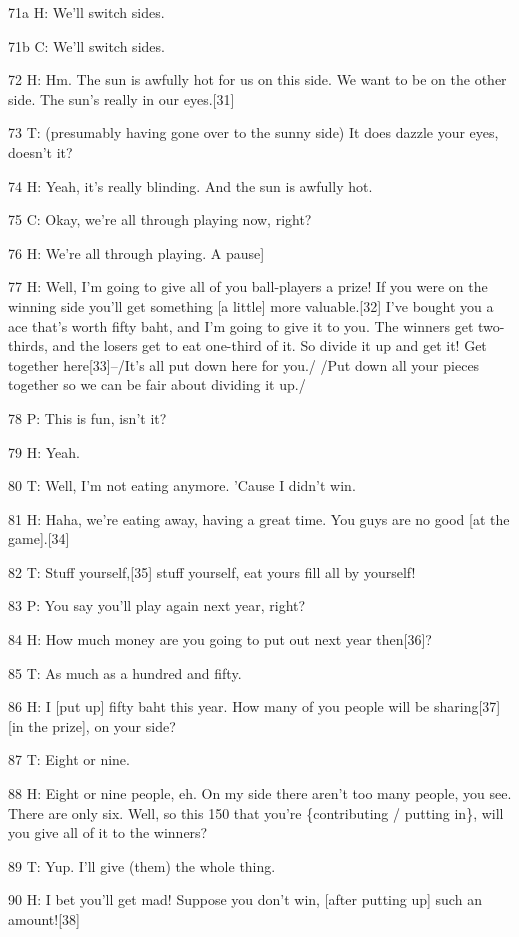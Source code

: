 71a H: We'll switch sides.

71b C: We'll switch sides.

72 H: Hm. The sun is awfully hot for us on this side. We want to be on the other
side. The sun's really in our eyes.[31]

73 T: (presumably having gone over to the sunny side) It does dazzle your eyes,
doesn't it?

74 H: Yeah, it's really blinding. And the sun is awfully hot.

75 C: Okay, we're all through playing now, right?

76 H: We're all through playing. A pause]

77 H: Well, I'm going to give all of you ball-players a prize! If you were on the
winning side you'll get something [a little] more valuable.[32] I've bought you
a ace that's worth fifty baht, and I'm going to give it to you. The winners get
two-thirds, and the losers get to eat one-third of it. So divide it up and get
it! Get together here[33]--/It's all put down here for you./ /Put down all your
pieces together so we can be fair about dividing it up./

78 P: This is fun, isn't it?

79 H: Yeah.

80 T: Well, I'm not eating anymore. 'Cause I didn't win.

81 H: Haha, we're eating away, having a great time. You guys are no good [at the
game].[34]

82 T: Stuff yourself,[35] stuff yourself, eat yours fill all by yourself!

83 P: You say you'll play again next year, right?

84 H: How much money are you going to put out next year then[36]?

85 T: As much as a hundred and fifty.

86 H: I [put up] fifty baht this year. How many of you people will be sharing[37]
[in the prize], on your side?

87 T: Eight or nine.

88 H: Eight or nine people, eh. On my side there aren't too many people, you see.
There are only six. Well, so this 150 that you're \{contributing / putting in\},
will you give all of it to the winners?

89 T: Yup. I'll give (them) the whole thing.

90 H: I bet you'll get mad! Suppose you don't win, [after putting up] such an amount![38]

